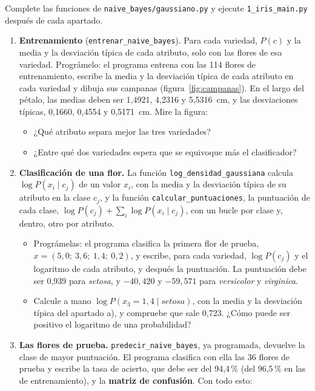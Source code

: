 \documentclass{article}
\begin{document}
\begin{exercise}[breakable]\label{ej:iris}
Complete las funciones de \texttt{naive\_bayes/gaussiano.py} y ejecute \texttt{1\_iris\_main.py} después de cada apartado.
\begin{enumerate}
    \item[a)] \textbf{Entrenamiento} (\texttt{entrenar\_naive\_bayes}). Para cada variedad, $P(c)$ y la media y la desviación típica de cada atributo, solo con las flores de esa variedad. Prográmelo: el programa entrena con las 114 flores de entrenamiento, escribe la media y la desviación típica de cada atributo en cada variedad y dibuja sus campanas (figura~\ref{fig:campanas}). En el largo del pétalo, las medias deben ser 1,4921, 4,2316 y 5,5316~cm, y las desviaciones típicas, 0,1660, 0,4554 y 0,5171~cm. Mire la figura: 
    \begin{itemize}
    \item ¿Qué atributo separa mejor las tres variedades? 
    \item ¿Entre qué dos variedades espera que se equivoque más el clasificador?    
    \end{itemize}
    \item[b)] \textbf{Clasificación de una flor.} La función \texttt{log\_densidad\_gaussiana} calcula $\log P(x_i \mid c_j)$ de un valor $x_i$, con la media y la desviación típica de su atributo en la clase $c_j$, y la función \texttt{calcular\_puntuaciones}, la puntuación de cada clase, $\log P(c_j) + \sum_i \log P(x_i \mid c_j)$, con un bucle por clase y, dentro, otro por atributo. 
	\begin{itemize}
		\item Prográmelas: el programa clasifica la primera flor de prueba, $x = (5{,}0;\ 3{,}6;\ 1{,}4;\ 0{,}2)$, y escribe, para cada variedad, $\log P(c_j)$ y el logaritmo de cada atributo, y después la puntuación. La puntuación debe ser 0,939 para \textit{setosa}, y $-40{,}420$ y $-59{,}571$ para \textit{versicolor} y \textit{virginica}.
		\item Calcule a mano $\log P(x_3 = 1{,}4 \mid \textit{setosa})$, con la media y la desviación típica del apartado a), y compruebe que sale 0,723. ¿Cómo puede ser positivo el logaritmo de una probabilidad?
	\end{itemize} 
    \item[c)] \textbf{Las flores de prueba.} \texttt{predecir\_naive\_bayes}, ya programada, devuelve la clase de mayor puntuación. El programa clasifica con ella las 36 flores de prueba y escribe la tasa de acierto, que debe ser del 94,4\,\% (del 96,5\,\% en las de entrenamiento), y la \textbf{matriz de confusión}. Con todo esto: 

\end{enumerate}
\end{exercise}
\end{document}
